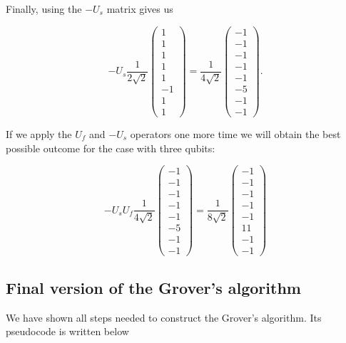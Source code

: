 Finally, using the $-U_s$ matrix gives us

\[ -U_s \frac{1}{2\sqrt{2}}\begin{pmatrix} 1 \\ 1 \\ 1 \\ 1 \\ 1 \\ -1 \\ 1 \\ 1 \end{pmatrix} = \frac{1}{4\sqrt{2}}\begin{pmatrix}
-1 \\ -1 \\ -1 \\ -1 \\ -1 \\ -5 \\ -1 \\ -1 \end{pmatrix}.\]

If we apply the $U_f$ and $-U_s$ operators one more time we will obtain the best possible outcome for the case with three qubits:

\[ -U_s U_f \frac{1}{4\sqrt{2}}\begin{pmatrix} -1 \\ -1 \\ -1 \\ -1 \\ -1 \\ -5 \\ -1 \\ -1 \end{pmatrix} = 
\frac{1}{8\sqrt{2}} \begin{pmatrix}
-1 \\ -1 \\ -1 \\ -1 \\ -1 \\ 11 \\ -1 \\ -1 \end{pmatrix}\]

\subsection{Final version of the Grover's algorithm}

We have shown all steps needed to construct the Grover's algorithm. Its pseudocode is written below

